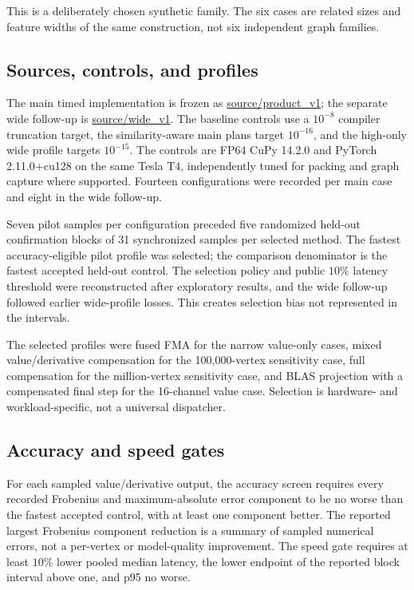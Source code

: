 \documentclass[10pt]{article}
\begin{document}
This is a deliberately chosen synthetic family. The six cases are related sizes and feature widths of the same construction, not six independent graph families.

\subsection{Sources, controls, and profiles}

The main timed implementation is frozen as \url{source/product_v1}; the separate wide follow-up is \url{source/wide_v1}. The baseline controls use a $10^{-8}$ compiler truncation target, the similarity-aware main plans target $10^{-16}$, and the high-only wide profile targets $10^{-15}$. The controls are FP64 CuPy 14.2.0 and PyTorch 2.11.0+cu128 on the same Tesla T4, independently tuned for packing and graph capture where supported. Fourteen configurations were recorded per main case and eight in the wide follow-up.

Seven pilot samples per configuration preceded five randomized held-out confirmation blocks of 31 synchronized samples per selected method. The fastest accuracy-eligible pilot profile was selected; the comparison denominator is the fastest accepted held-out control. The selection policy and public $10\%$ latency threshold were reconstructed after exploratory results, and the wide follow-up followed earlier wide-profile losses. This creates selection bias not represented in the intervals.

The selected profiles were fused FMA for the narrow value-only cases, mixed value/derivative compensation for the 100,000-vertex sensitivity case, full compensation for the million-vertex sensitivity case, and BLAS projection with a compensated final step for the 16-channel value case. Selection is hardware- and workload-specific, not a universal dispatcher.

\subsection{Accuracy and speed gates}

For each sampled value/derivative output, the accuracy screen requires every recorded Frobenius and maximum-absolute error component to be no worse than the fastest accepted control, with at least one component better. The reported largest Frobenius component reduction is a summary of sampled numerical errors, not a per-vertex or model-quality improvement. The speed gate requires at least $10\%$ lower pooled median latency, the lower endpoint of the reported block interval above one, and p95 no worse.
\end{document}
